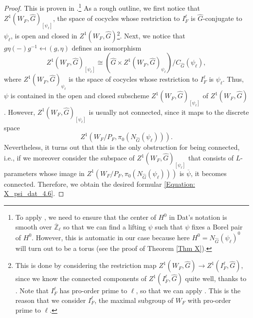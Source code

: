 \begin{proof}
	This is proven in \cite[Subsection 4.6]{dat2022ihes}.\footnote{To apply \cite[Subsection 4.6]{dat2022ihes}, we need to ensure that the center of $H^0$ in Dat's notation is smooth over $\overline{\mathbb{Z}}_{\ell}$ so that we can find a lifting $\psi$ such that $\psi$ fixes a Borel pair of $H^0$. However, this is automatic in our case because here $H^0=N_{\hat{G}}(\psi_{\ell})^0$ will turn out to be a torus (see the proof of Theorem \ref{Thm X}).} As a rough outline, we first notice that $Z^1(W_F, \hat{G})_{[\psi_{\ell}]}$, the space of cocycles whose restriction to $I_F^{\ell}$ is $\hat{G}$-conjugate to $\psi_{\ell}$, is open and closed in $Z^1(W_F, \hat{G})$\footnote{This is done by considering the restriction map $Z^1(W_F, \hat{G}) \to Z^1(I_F^{\ell}, \hat{G})$, since we know the connected components of $Z^1(I_F^{\ell}, \hat{G})$ quite well, thanks to \cite[Theorem 4.2]{dat2022ihes}. Note that $I_F^{\ell}$ has pro-order prime to $\ell$, so that we can apply \cite[Theorem 4.2]{dat2022ihes}. This is the reason that we consider $I_F^{\ell}$, the maximal subgroup of $W_F$ with pro-order prime to $\ell$.}. Next, we notice that
	$g\eta(-)g^{-1} \mapsfrom (g, \eta)$
    defines an isomorphism
    $$Z^1(W_F, \hat{G})_{[\psi_{\ell}]} \cong \left(\hat{G} \times Z^1(W_F, \hat{G})_{\psi_{\ell}}\right)/C_{\hat{G}}(\psi_{\ell}),$$
    where $Z^1(W_F, \hat{G})_{\psi_{\ell}}$ is the space of cocycles whose restriction to $I_F^{\ell}$ is $\psi_{\ell}$. Thus, $\psi$ is contained in the open and closed subscheme $Z^1(W_F, \hat{G})_{[\psi_{\ell}]}$ of $Z^1(W_F, \hat{G})$. However, $Z^1(W_F, \hat{G})_{[\psi_{\ell}]}$ is usually not connected, since it maps to the discrete space 
    $$Z^1(W_F/P_F, \pi_0(N_{\hat{G}}(\psi_{\ell}))).$$
    Nevertheless, it turns out that this is the only obstruction for being connected, i.e., if we moreover consider the subspace of $Z^1(W_F, \hat{G})_{[\psi_{\ell}]}$ that consists of $L$-parameters whose image in $Z^1(W_F/P_F, \pi_0(N_{\hat{G}}(\psi_{\ell})))$ is $\overline{\psi}$, it becomes connected. Therefore, we obtain the desired formular \eqref{Equation: X_psi_dat_4.6}.
\end{proof}

